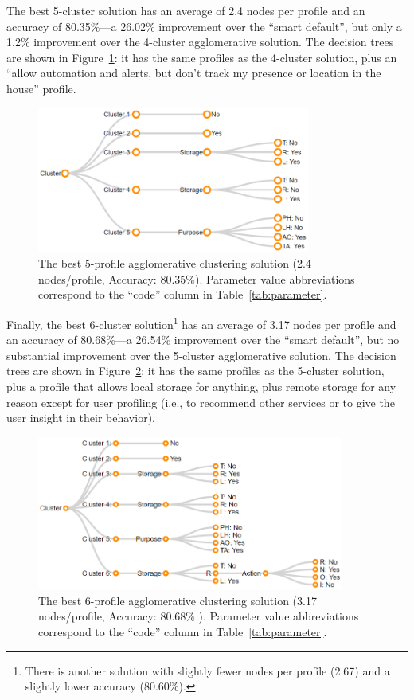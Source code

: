 The best 5-cluster solution has an average of 2.4 nodes per profile and an accuracy of 80.35\%---a 26.02\% improvement over the ``smart default'', but only a 1.2\% improvement over the 4-cluster agglomerative solution. The decision trees are shown in Figure~\ref{fig:conglo_5_profile001}: it has the same profiles as the 4-cluster solution, plus an ``allow automation and alerts, but don't track my presence or location in the house'' profile.

\begin{figure}
	\centering
	\includegraphics[width=0.8\textwidth]{figures/conglo_5_profile001.png}
	\caption{The best 5-profile agglomerative clustering solution (2.4 nodes/profile, Accuracy: 80.35\%). Parameter value abbreviations correspond to the ``code'' column in Table~\ref{tab:parameter}.}
	\label{fig:conglo_5_profile001}
\end{figure}

Finally, the best 6-cluster solution\footnote{There is another solution with slightly fewer nodes per profile (2.67) and a slightly lower accuracy (80.60\%).} has an average of 3.17 nodes per profile and an accuracy of 80.68\%---a 26.54\% improvement over the ``smart default'', but no substantial improvement over the 5-cluster agglomerative solution. The decision trees are shown in Figure~\ref{fig:conglo_6_profile001}: it has the same profiles as the 5-cluster solution, plus a profile that allows local storage for anything, plus remote storage for any reason except for user profiling (i.e., to recommend other services or to give the user insight in their behavior).

\begin{figure}
	\centering
	\includegraphics[width=0.9\textwidth]{figures/conglo_6_profile001.png}
	\caption{The best 6-profile agglomerative clustering solution (3.17 nodes/profile, Accuracy: 80.68\% ). Parameter value abbreviations correspond to the ``code'' column in Table~\ref{tab:parameter}.}
	\label{fig:conglo_6_profile001}
\end{figure}

